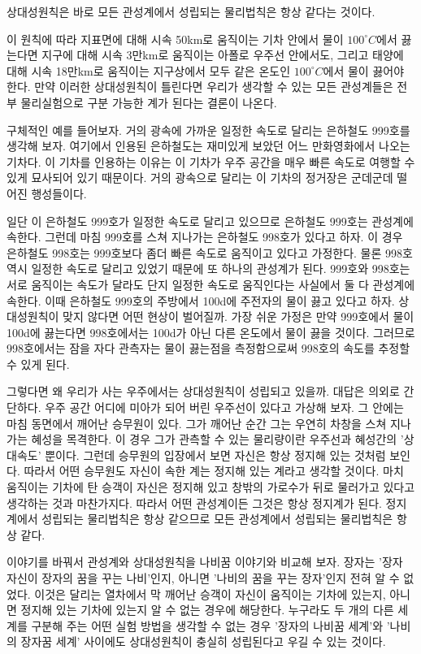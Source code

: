 \beginbf
  상대성원칙은 바로 모든 관성계에서 성립되는 물리법칙은 항상 같다는 것이다.
\endbf

이 원칙에 따라 지표면에 대해 시속 50km로 움직이는 기차 안에서 물이 $100^\circ C$에서 
끓는다면
지구에 대해 시속 3만km로 움직이는 아폴로  우주선 안에서도, 그리고 태양에 대해 시속
18만km로 움직이는 지구상에서 모두 같은 온도인 $100^\circ C$에서 물이 끓어야 한다.
만약 이러한 상대성원칙이 틀린다면 우리가 생각할 수 있는 모든 관성계들은 전부 물리실험으로
구분 가능한 계가 된다는 결론이 나온다.

구체적인 예를 들어보자. 거의 광속에 가까운 일정한 속도로 달리는 은하철도 999호를
생각해 보자. 여기에서 인용된 은하철도는 재미있게 보았던 어느 만화영화에서 나오는 기차다. 이
기차를 인용하는 이유는 이 기차가 우주 공간을 매우 빠른 속도로 여행할 수 있게 묘사되어 있기
때문이다. 거의 광속으로 달리는 이 기차의 정거장은 군데군데 떨어진 행성들이다.

일단 이 은하철도 999호가 일정한 속도로 달리고 있으므로 은하철도 999호는 관성계에 속한다.
그런데 마침 999호를 스쳐 지나가는 은하철도 998호가 있다고 하자. 이 경우 은하철도 998호는
999호보다 좀더 빠른 속도로 움직이고 있다고 가정한다. 물론 998호 역시 일정한 속도로 달리고
있었기 때문에 또 하나의 관성계가 된다. 999호와 998호는 서로 움직이는 속도가 달라도 단지
일정한 속도로 움직인다는 사실에서 둘 다 관성계에 속한다. 이때 은하철도 999호의 주방에서
100d에 주전자의 물이 끓고 있다고 하자. 상대성원칙이 맞지 않다면 어떤 현상이 벌어질까. 가장
쉬운 가정은 만약 999호에서 물이 100d에 끓는다면 998호에서는 100d가 아닌 다른 
온도에서 물이
끓을 것이다. 그러므로 998호에서는 잠을 자다 관측자는 물이 끓는점을 측정함으로써 998호의
속도를 추정할 수 있게 된다.

  그렇다면 왜 우리가 사는 우주에서는 상대성원칙이 성립되고 있을까. 대답은 의외로 간단하다.
우주 공간 어디에 미아가 되어 버린 우주선이 있다고 가상해 보자. 그 안에는 마침 동면에서
깨어난 승무원이 있다. 그가 깨어난 순간 그는 우연히 차창을 스쳐 지나가는 혜성을 목격한다.
이 경우 그가 관측할 수 있는 물리량이란 우주선과 혜성간의 '상대속도' 뿐이다. 그런데 승무원의
입장에서 보면 자신은 항상 정지해 있는 것처럼 보인다. 따라서 어떤 승무원도 자신이 속한 계는
정지해 있는 계라고 생각할 것이다. 마치 움직이는 기차에 탄 승객이 자신은 정지해 있고 창밖의
가로수가 뒤로 물러가고 있다고 생각하는 것과 마찬가지다. 따라서 어떤 관성계이든 그것은 항상
정지계가 된다. 정지계에서 성립되는 물리법칙은 항상 같으므로 모든 관성계에서 성립되는
물리법칙은 항상 같다.

이야기를 바꿔서 관성계와 상대성원칙을 나비꿈 이야기와 비교해 보자. 장자는 '장자 자신이
장자의 꿈을 꾸는 나비'인지, 아니면 '나비의 꿈을 꾸는 장자'인지 전혀 알 수 없었다. 이것은
달리는 열차에서 막 깨어난 승객이 자신이 움직이는 기차에 있는지, 아니면 정지해 있는 기차에
있는지 알 수 없는 경우에 해당한다. 누구라도 두 개의 다른 세계를 구분해 주는 어떤 실험
방법을 생각할 수 없는 경우 '장자의 나비꿈 세계'와 '나비의 장자꿈 세계' 사이에도
상대성원칙이 충실히 성립된다고 우길 수 있는 것이다.

